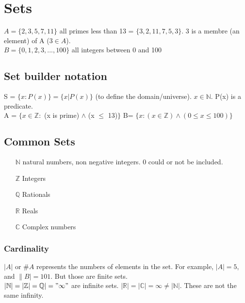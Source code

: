 \documentclass[12pt,a4paper]{article}
\begin{document}
\section{Sets}
\begin{center}
\end{center}
$A = \{2,3,5,7,11\}$ all primes less than 13 = $\{3,2,11,7,5,3\}$. 3 is a membre (an element) of A ($3 \in A$).\\
$B = \{0,1,2,3,...,100\}$ all integers between 0 and 100

\subsection{Set builder notation}
S = $\{x : P(x)\} = \{x| P(x)\}$ (to define the domain/universe). $x \in \mathbb{N}$. P(x) is a predicate.\\
A = $\{x \in \mathbb{Z} :$ (x is prime) $\wedge$ (x $\leq$ 13)$\}$
B= $\{x : (x \in \mathbb{Z}) \wedge (0 \leq x \leq 100)\}$

\subsection{Common Sets}
\begin{itemize}
	\item[$\mathbb{N}$] natural numbers, non negative integers. 0 could or not be included.
	\item[$\mathbb{Z}$] Integers
	\item[$\mathbb{Q}$] Rationals
	\item[$\mathbb{R}$] Reals
	\item[$\mathbb{C}$] Complex numbers
\end{itemize}

\subsubsection{Cardinality}
$|A|$ or $\#A$ represents the numbers of elements in the set. For example, $|A| = 5$, and $\|B| = 101$. But those are finite sets.\\
$|\mathbb{N}| =  |\mathbb{Z}| = \mathbb{Q}| = "\infty"$ are infinite sets.
$|\mathbb{R}| =  |\mathbb{C}| = \infty \neq |\mathbb{N}|$. These are not the same infinity.
\end{document}
